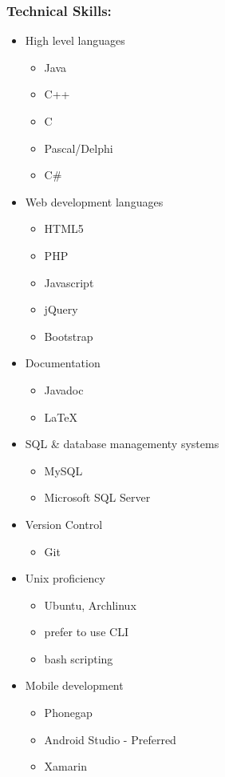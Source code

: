 \documentclass{article}
\begin{document}
	\subsubsection{Technical Skills:}
	\begin{itemize}
		\item High level languages
			\begin{itemize}
				\item Java
				\item C++
				\item C
				\item Pascal/Delphi
				\item C#
			\end{itemize}
		\item Web development languages
			\begin{itemize}
				\item HTML5
				\item PHP
				\item Javascript
				\item jQuery
				\item Bootstrap
			\end{itemize}
		\item Documentation
			\begin{itemize}
				\item Javadoc
				\item LaTeX
			\end{itemize}
		\item SQL & database managementy systems
			\begin{itemize}
				\item MySQL
				\item Microsoft SQL Server
			\end{itemize}
		\item Version Control
			\begin{itemize}
				\item Git
			\end{itemize}
		\item Unix proficiency
			\begin{itemize}
				\item Ubuntu, Archlinux
				\item prefer to use CLI
				\item bash scripting
			\end{itemize}
		\item Mobile development
			\begin{itemize}
				\item Phonegap
				\item Android Studio - Preferred
				\item Xamarin
			\end{itemize}
	\end{itemize}
\end{document}
